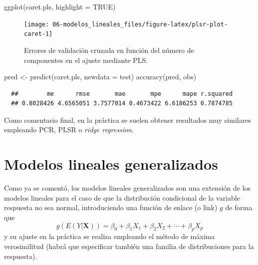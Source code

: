 \documentclass[
]{book}
\newenvironment{Shaded}{\begin{snugshade}}{\end{snugshade}}
\newcommand{\AttributeTok}[1]{\textcolor[rgb]{0.77,0.63,0.00}{#1}}
\newcommand{\ConstantTok}[1]{\textcolor[rgb]{0.00,0.00,0.00}{#1}}
\newcommand{\FunctionTok}[1]{\textcolor[rgb]{0.00,0.00,0.00}{#1}}
\newcommand{\NormalTok}[1]{#1}
\newcommand{\OtherTok}[1]{\textcolor[rgb]{0.56,0.35,0.01}{#1}}
\theoremstyle{break}
\theoremstyle{nonumberplain}
\begin{document}
\begin{Shaded}
\begin{Highlighting}[]
\FunctionTok{ggplot}\NormalTok{(caret.pls, }\AttributeTok{highlight =} \ConstantTok{TRUE}\NormalTok{)}
\end{Highlighting}
\end{Shaded}

\begin{figure}[!htb]

{\centering \texttt{[image: 06-modelos\_lineales\_files/figure-latex/plsr-plot-caret-1]} 

}

\caption{Errores de validación cruzada en función del número de componentes en el ajuste mediante PLS.}\label{fig:plsr-plot-caret}
\end{figure}

\begin{Shaded}
\begin{Highlighting}[]
\NormalTok{pred }\OtherTok{\textless{}{-}} \FunctionTok{predict}\NormalTok{(caret.pls, }\AttributeTok{newdata =}\NormalTok{ test)}
\FunctionTok{accuracy}\NormalTok{(pred, obs)}
\end{Highlighting}
\end{Shaded}

\begin{verbatim}
  ##        me      rmse       mae       mpe      mape r.squared 
  ## 0.8028426 4.6565051 3.7577014 0.4673422 6.6186253 0.7874785
\end{verbatim}

Como comentario final, en la práctica se suelen obtener resultados muy similares empleando PCR, PLSR o \emph{ridge regression}.

\hypertarget{reg-glm}{%
\section{Modelos lineales generalizados}\label{reg-glm}}

Como ya se comentó, los modelos lineales generalizados son una extensión de los modelos lineales para el caso de que la distribución condicional de la variable respuesta no sea normal, introduciendo una función de enlace (o link) \(g\) de forma que
\[g\left(E(Y | \mathbf{X} )\right) = \beta_{0}+\beta_{1}X_{1}+\beta_{2}X_{2}+\cdots+\beta_{p}X_{p}\]
y su ajuste en la práctica se realiza empleando el método de máxima verosimilitud (habrá que especificar también una familia de distribuciones para la respuesta).
\end{document}
